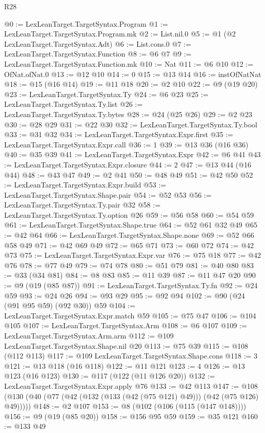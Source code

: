 \begin{lexlean}{R28}
\begin{coremodule}
@0 := LexLeanTarget.TargetSyntax.Program
@1 := LexLeanTarget.TargetSyntax.Program.mk
@2 := List.nil.{0}
@5 := @1 (@2 LexLeanTarget.TargetSyntax.Adt)
@6 := List.cons.{0}
@7 := LexLeanTarget.TargetSyntax.Function
@8 := @6 @7
@9 := LexLeanTarget.TargetSyntax.Function.mk
@10 := Nat
@11 := @6 @10
@12 := OfNat.ofNat.{0}
@13 := @12 @10
@14 := 0
@15 := @13 @14
@16 := instOfNatNat
@18 := @15 (@16 @14)
@19 := @11 @18
@20 := @2 @10
@22 := @9 (@19 @20)
@23 := LexLeanTarget.TargetSyntax.Ty
@24 := @6 @23
@25 := LexLeanTarget.TargetSyntax.Ty.list
@26 := LexLeanTarget.TargetSyntax.Ty.bytes
@28 := @24 (@25 @26)
@29 := @2 @23
@30 := @28 @29
@31 := @22 @30
@32 := LexLeanTarget.TargetSyntax.Ty.bool
@33 := @31 @32
@34 := LexLeanTarget.TargetSyntax.Expr.first
@35 := LexLeanTarget.TargetSyntax.Expr.call
@36 := 1
@39 := @13 @36 (@16 @36)
@40 := @35 @39
@41 := LexLeanTarget.TargetSyntax.Expr
@42 := @6 @41
@43 := LexLeanTarget.TargetSyntax.Expr.closure
@44 := 2
@47 := @13 @44 (@16 @44)
@48 := @43 @47
@49 := @2 @41
@50 := @48 @49
@51 := @42 @50
@52 := LexLeanTarget.TargetSyntax.Expr.build
@53 := LexLeanTarget.TargetSyntax.Shape.pair
@54 := @52 @53
@56 := LexLeanTarget.TargetSyntax.Ty.pair @32
@58 := LexLeanTarget.TargetSyntax.Ty.option @26
@59 := @56 @58
@60 := @54 @59
@61 := LexLeanTarget.TargetSyntax.Shape.true
@64 := @52 @61 @32 @49
@65 := @42 @64
@66 := LexLeanTarget.TargetSyntax.Shape.none
@69 := @52 @66 @58 @49
@71 := @42 @69 @49
@72 := @65 @71
@73 := @60 @72
@74 := @42 @73
@75 := LexLeanTarget.TargetSyntax.Expr.var
@76 := @75 @18
@77 := @42 @76
@78 := @77 @49
@79 := @74 @78
@80 := @51 @79
@81 := @40 @80
@83 := @33 (@34 @81)
@84 := @8 @83
@85 := @11 @39
@87 := @11 @47 @20
@90 := @9 (@19 (@85 @87))
@91 := LexLeanTarget.TargetSyntax.Ty.fn
@92 := @24 @59
@93 := @24 @26
@94 := @93 @29
@95 := @92 @94
@102 := @90 (@24 (@91 @95 @59) (@92 @30)) @59
@104 := LexLeanTarget.TargetSyntax.Expr.match @59
@105 := @75 @47
@106 := @104 @105
@107 := LexLeanTarget.TargetSyntax.Arm
@108 := @6 @107
@109 := LexLeanTarget.TargetSyntax.Arm.arm
@112 := @109 LexLeanTarget.TargetSyntax.Shape.nil @20
@113 := @75 @39
@115 := @108 (@112 @113)
@117 := @109 LexLeanTarget.TargetSyntax.Shape.cons
@118 := 3
@121 := @13 @118 (@16 @118)
@122 := @11 @121
@123 := 4
@126 := @13 @123 (@16 @123)
@130 := @117 (@122 (@11 @126 @20))
@132 := LexLeanTarget.TargetSyntax.Expr.apply @76
@133 := @42 @113
@147 := @108 (@130 (@40 (@77 (@42 (@132 (@133 (@42 (@75 @121) @49))) (@42 (@75 @126) @49)))))
@148 := @2 @107
@153 := @8 (@102 (@106 (@115 (@147 @148))))
@156 := @9 (@19 (@85 @20))
@158 := @156 @95 @59
@159 := @35 @121
@160 := @133 @49

\end{coremodule}
\end{lexlean}

